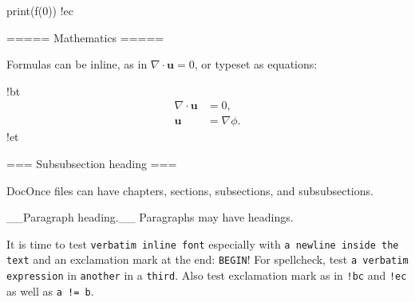 \documentclass[%
oneside,                 %
final,                   %
10pt]{article}
\theoremstyle{definition}
\begin{document}
print(f(0))
!ec


===== Mathematics =====

Formulas can be inline, as in $\nabla\cdot\bm{u} = 0$, or typeset
as equations:

!bt
\begin{align*}
\nabla\cdot\bm{u} &= 0,\\ 
\bm{u} &= \nabla\phi .
\end{align*}
!et

=== Subsubsection heading ===

DocOnce files can have chapters, sections, subsections, and subsubsections.

__Paragraph heading.__ Paragraphs may have headings.

\edo


It is time to test \texttt{verbatim inline font} especially with \texttt{a newline inside the text} and an exclamation mark at the end: \texttt{BEGIN}! For
spellcheck, test \texttt{a verbatim expression} in \texttt{another} in a \texttt{third}.
Also test exclamation mark as in \Verb?!bc? and \Verb?!ec? as well as \Verb?a != b?.
\end{document}

